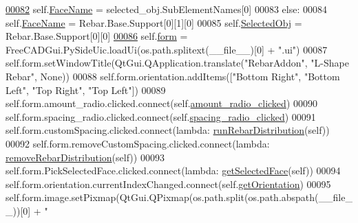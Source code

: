 \begin{DoxyCode}
\hypertarget{LShapeRebar_8py_source.tex_l00082}{}\hyperlink{classLShapeRebar_1_1__LShapeRebarTaskPanel_a8f624818baf68844984b3368f27dc421}{00082}             self.\hyperlink{classLShapeRebar_1_1__LShapeRebarTaskPanel_a8f624818baf68844984b3368f27dc421}{FaceName} = selected\_obj.SubElementNames[0]
00083         \textcolor{keywordflow}{else}:
00084             self.\hyperlink{classLShapeRebar_1_1__LShapeRebarTaskPanel_a8f624818baf68844984b3368f27dc421}{FaceName} = Rebar.Base.Support[0][1][0]
00085             self.\hyperlink{classLShapeRebar_1_1__LShapeRebarTaskPanel_a71f1ee825528164c18315a0234f6da5d}{SelectedObj} = Rebar.Base.Support[0][0]
\hypertarget{LShapeRebar_8py_source.tex_l00086}{}\hyperlink{classLShapeRebar_1_1__LShapeRebarTaskPanel_af6e6f9deafab993e53dabc404d832bef}{00086}         self.\hyperlink{classLShapeRebar_1_1__LShapeRebarTaskPanel_af6e6f9deafab993e53dabc404d832bef}{form} = FreeCADGui.PySideUic.loadUi(os.path.splitext(\_\_file\_\_)[0] + \textcolor{stringliteral}{".ui"})
00087         self.form.setWindowTitle(QtGui.QApplication.translate(\textcolor{stringliteral}{"RebarAddon"}, \textcolor{stringliteral}{"L-Shape Rebar"}, \textcolor{keywordtype}{None}))
00088         self.form.orientation.addItems([\textcolor{stringliteral}{"Bottom Right"}, \textcolor{stringliteral}{"Bottom Left"}, \textcolor{stringliteral}{"Top Right"}, \textcolor{stringliteral}{"Top Left"}])
00089         self.form.amount\_radio.clicked.connect(self.\hyperlink{classLShapeRebar_1_1__LShapeRebarTaskPanel_a81791eac05be58c6df27977089106a0f}{amount\_radio\_clicked})
00090         self.form.spacing\_radio.clicked.connect(self.\hyperlink{classLShapeRebar_1_1__LShapeRebarTaskPanel_a96a085e4b791b00a372b66ea558c440e}{spacing\_radio\_clicked})
00091         self.form.customSpacing.clicked.connect(\textcolor{keyword}{lambda}: \hyperlink{namespaceRebarDistribution_aa547df5cb10d2e64eaa0b51c445fa30b}{runRebarDistribution}(self))
00092         self.form.removeCustomSpacing.clicked.connect(\textcolor{keyword}{lambda}: 
      \hyperlink{namespaceRebarDistribution_a85270a1b6e8c782a9e0ba54add518f2a}{removeRebarDistribution}(self))
00093         self.form.PickSelectedFace.clicked.connect(\textcolor{keyword}{lambda}: \hyperlink{namespaceRebarfunc_a8c003df49ac5f249bd9ea4acfb7d2f8d}{getSelectedFace}(self))
00094         self.form.orientation.currentIndexChanged.connect(self.\hyperlink{classLShapeRebar_1_1__LShapeRebarTaskPanel_a1e13b2224b0ea68b9519c094004087ae}{getOrientation})
00095         self.form.image.setPixmap(QtGui.QPixmap(os.path.split(os.path.abspath(\_\_file\_\_))[0] + \textcolor{stringliteral}{"
}
\end{DoxyCode}
